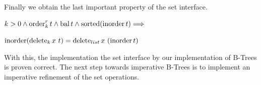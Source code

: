Finally we obtain the last important property of the set interface.
\begin{theorem}
    $k > 0 \wedge \operatorname{order}^r_k t \wedge \operatorname{bal} t \wedge \operatorname{sorted}  (\operatorname{inorder} t)\Longrightarrow$\\
    \begin{center}
    $\operatorname{inorder} (\operatorname{delete}_k x\ t) = \operatorname{delete}_{list} x\ (\operatorname{inorder} t)$
    \end{center}
\end{theorem}

With this, the implementation the set interface by
our implementation of B-Trees is proven correct.
The next step towards imperative B-Trees is to implement
an imperative refinement of the set operations.
